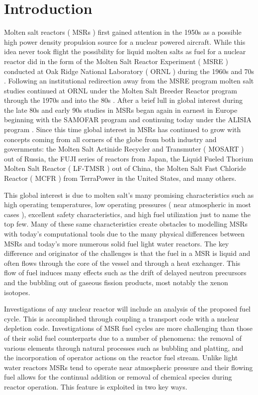 \chapter{Introduction}\label{ch:intro}

Molten salt reactors ( MSRs ) first gained attention in the 1950s as a possible
high power density propulsion source for a nuclear powered aircraft. While this
idea never took flight the possibility for liquid molten salts as fuel for a
nuclear reactor did in the form of the Molten Salt Reactor Experiment ( MSRE )
conducted at Oak Ridge National Laboratory ( ORNL ) during the 1960s and 70s 
\cite{ORNL}. Following an institutional redirection away from the MSRE
program molten salt studies continued at ORNL under the Molten Salt Breeder
Reactor program through the 1970s and into the 80s \cite{ORNL}. After a
brief lull in global interest during the late 80s and early 90s studies in MSRs
began again in earnest in Europe beginning with the SAMOFAR program and continuing
today under the ALISIA program \cite{SAMOFAR}. Since this time global interest
in MSRs has continued to grow with concepts coming from all corners of the
globe from both industry and governments: the Molten Salt Actinide Recycler and
Transmuter ( MOSART ) out of Russia, the FUJI series of reactors from Japan, 
the Liquid Fueled Thorium Molten Salt Reactor ( LF-TMSR ) out of China, the
Molten Salt Fast Chloride Reactor ( MCFR ) from TerraPower in the United States,
and many others.

This global interest is due to molten salt's many promising characteristics such
as high operating temperatures, low operating pressures ( near atmospheric in
most cases ), excellent safety characteristics, and high fuel utilization just
to name the top few. Many of these same characteristics create obstacles to 
modelling MSRs with today's computational tools due to the many physical
differences between MSRs and today's more numerous solid fuel light water
reactors. The key difference and originator of the challenges is that the fuel
in a MSR is liquid and often flows through the core of the vessel and through
a heat exchanger. This flow of fuel induces many effects such as the drift of
delayed neutron precursors and the bubbling out of gaseous fission products,
most notably the xenon isotopes.

Investigations of any nuclear reactor will include an analysis of the proposed
fuel cycle. This is accomplished through coupling a transport code with a
nuclear depletion code. Investigations of MSR fuel cycles are more challenging
than those of their solid fuel counterparts due to a number of phenomena: the
removal of various elements through natural processes such as bubbling and
platting, and the incorporation of operator actions on the reactor fuel stream.
Unlike light water reactors MSRs tend to operate near atmospheric pressure and
their flowing fuel allows for the continual addition or removal of chemical
species during reactor operation. This feature is exploited in two key ways.

